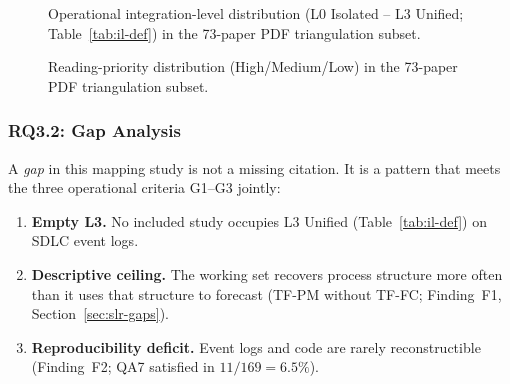 \begin{figure}[htbp]
\centering
{}
\caption{Operational integration-level distribution (L0 Isolated -- L3 Unified;
Table~\ref{tab:il-def}) in the 73-paper PDF triangulation subset.}
\label{fig:pdf-integration}
\end{figure}

\begin{figure}[htbp]
\centering
{}
\caption{Reading-priority distribution (High/Medium/Low) in the 73-paper PDF triangulation subset.}
\label{fig:pdf-priority}
\end{figure}

\subsubsection{RQ3.2: Gap Analysis}
\label{sec:slr-rq32}

A \emph{gap} in this mapping study is not a missing citation. It is a
pattern that meets the three operational criteria G1--G3 jointly:

\begin{enumerate}
\item[G1] \textbf{Empty L3.} No included study occupies L3 Unified
  (Table~\ref{tab:il-def}) on SDLC event logs.
\item[G2] \textbf{Descriptive ceiling.} The working set recovers process
  structure more often than it uses that structure to forecast
  (TF-PM without TF-FC; Finding~F1, Section~\ref{sec:slr-gaps}).
\item[G3] \textbf{Reproducibility deficit.} Event logs and code are rarely
  reconstructible (Finding~F2; QA7 satisfied in $11/169 = 6.5\%$).
\end{enumerate}

